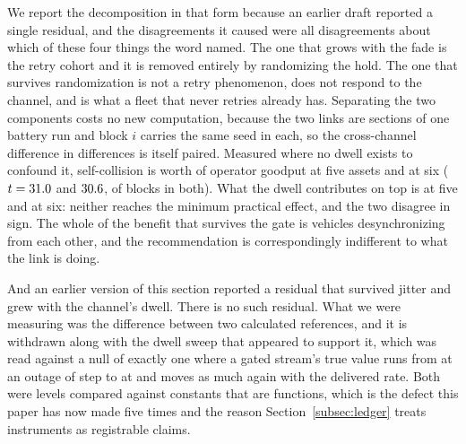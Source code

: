 \documentclass[11pt]{article}
\begin{document}
We report the decomposition in that form because an earlier draft reported a single residual, and the disagreements it caused were all disagreements about which of these four things the word named. The one that grows with the fade is the retry cohort and it is removed entirely by randomizing the hold. The one that survives randomization is not a retry phenomenon, does not respond to the channel, and is what a fleet that never retries already has.
Separating the two components costs no new computation, because the two links are sections of one battery run and block $i$ carries the same seed in each, so the cross-channel difference in differences is itself paired. Measured where no dwell exists to confound it, self-collision is worth \dcGoodSelfFive{} of operator goodput at five assets and \dcGoodSelfSix{} at six ($t = 31.0{}$ and $30.6{}$, \dcGoodSelfSixBlocks{} of \dcBlocks{} blocks in both). What the dwell contributes on top is \dcGoodDwellFive{} at five and \dcGoodDwellSix{} at six: neither reaches the minimum practical effect, and the two disagree in sign. The whole of the benefit that survives the gate is vehicles desynchronizing from each other, and the recommendation is correspondingly indifferent to what the link is doing.

And an earlier version of this section reported a residual that survived jitter and grew with the channel's dwell. There is no such residual. What we were measuring was the difference between two calculated references, and it is withdrawn along with the dwell sweep that appeared to support it, which was read against a null of exactly one where a gated stream's true value runs from \bgLowNull{} at an outage of \bgLowL{} step to \bgHighNull{} at \bgHighL{} and moves as much again with the delivered rate. Both were levels compared against constants that are functions, which is the defect this paper has now made five times and the reason Section~\ref{subsec:ledger} treats instruments as registrable claims.
\end{document}
